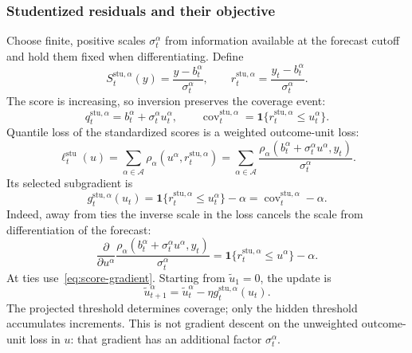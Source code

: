 \documentclass[11pt,a4paper]{article}
\newcommand{\A}{\mathcal{A}}
\newcommand{\ind}{\mathbf{1}}
\newcommand{\stu}{\mathrm{stu}}
\DeclareMathOperator{\cov}{cov}
\theoremstyle{definition}
\theoremstyle{remark}
\begin{document}
\subsubsection{Studentized residuals and their objective}
Choose finite, positive scales $\sigma_t^\alpha$ from information
available at the forecast cutoff and hold them fixed when differentiating. Define
\begin{equation}
 S_t^{\stu,\alpha}(y)=\frac{y-b_t^\alpha}{\sigma_t^\alpha},\qquad
 r_t^{\stu,\alpha}=\frac{y_t-b_t^\alpha}{\sigma_t^\alpha}.
 \label{eq:student-score}
\end{equation}
The score is increasing, so inversion preserves the coverage event:
\begin{equation}
 q_t^{\stu,\alpha}=b_t^\alpha+\sigma_t^\alpha u_t^\alpha,\qquad
 \cov_t^{\stu,\alpha}=\ind\{r_t^{\stu,\alpha}\le u_t^\alpha\}.
 \label{eq:student-inversion}
\end{equation}
Quantile loss of the standardized scores is a weighted outcome-unit loss:
\begin{equation}
 \ell_t^\stu(u)=\sum_{\alpha\in\A}\rho_\alpha(u^\alpha,r_t^{\stu,\alpha})
 =\sum_{\alpha\in\A}\frac{
 \rho_\alpha(b_t^\alpha+\sigma_t^\alpha u^\alpha,y_t)}{\sigma_t^\alpha}.
 \label{eq:student-loss}
\end{equation}
Its selected subgradient is
\begin{equation}
 g_t^{\stu,\alpha}(u_t)
 =\ind\{r_t^{\stu,\alpha}\le u_t^\alpha\}-\alpha
 =\cov_t^{\stu,\alpha}-\alpha.
 \label{eq:student-gradient}
\end{equation}
Indeed, away from ties the inverse scale in the loss cancels the scale
from differentiation of the forecast:
\begin{equation}
 \frac{\partial}{\partial u^\alpha}
 \frac{\rho_\alpha(b_t^\alpha+\sigma_t^\alpha u^\alpha,y_t)}{\sigma_t^\alpha}
 =\ind\{r_t^{\stu,\alpha}\le u^\alpha\}-\alpha.
 \label{eq:scale-cancellation}
\end{equation}
At ties use~\eqref{eq:score-gradient}. Starting from $\tilde u_1=0$,
the update is
\begin{equation}
 \tilde u_{t+1}^\alpha=\tilde u_t^\alpha
 -\eta g_t^{\stu,\alpha}(u_t).
 \label{eq:student-update}
\end{equation}
The projected threshold determines coverage; only the hidden threshold
accumulates increments. This is not gradient descent on the unweighted
outcome-unit loss in $u$: that gradient has an additional factor
$\sigma_t^\alpha$.
\end{document}
